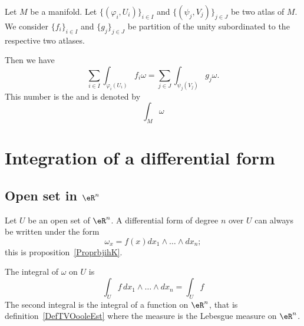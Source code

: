 \begin{propositionDef}       \label{DEFooOMQLooGiJWZS}
	Let \( M\) be a manifold. Let \(  \{ (\varphi_i,U_i) \}_{i\in I}\) and \( \{ (\psi_j,V_j) \}_{j\in J}\) be two atlas of \( M\). We consider \( \{ f_i \}_{i\in I}\) and \( \{ g_j \}_{j\in J}\) be partition of the unity subordinated to the respective two atlases.

	Then we have
	\begin{equation}
		\sum_{i\in I}\int_{\varphi_i(U_i)}f_i\omega=\sum_{j\in J}\int_{\psi_j(V_j)}g_j\omega.
	\end{equation}
	This number is the  and is denoted by
	\begin{equation}
		\int_M\omega
	\end{equation}
\end{propositionDef}


\section{Integration of a differential form}

\subsection{Open set in \( \eR^n\)}

Let \( U\) be an open set of \( \eR^n\). A differential form of degree \( n\) over \( U\) can always be written under the form
\begin{equation}
	\omega_x=f(x)dx_1\wedge\ldots\wedge dx_n;
\end{equation}
this is proposition~\ref{ProprbjihK}.

\begin{definition}      \label{DEFooEYRFooRQTmRF}
	The integral of \( \omega\) on \( U\) is
	\begin{equation}
		\int_{U}f\,dx_1\wedge\ldots\wedge dx_n=\int_Uf
	\end{equation}
	The second integral is the integral of a function on \( \eR^n\), that is definition~\ref{DefTVOooleEst} where the measure is the Lebesgue measure on \( \eR^n\).
\end{definition}

